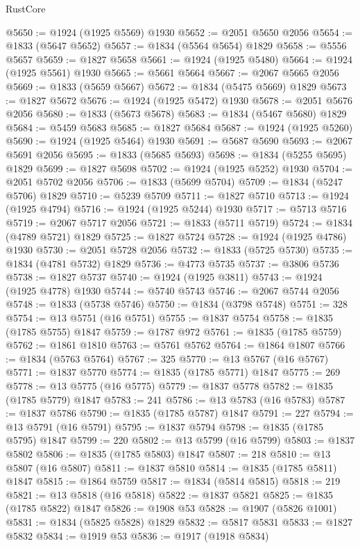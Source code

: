 \begin{lexlean}{RustCore}
\begin{coremodule}
@5650 := @1924 (@1925 @5569) @1930
@5652 := @2051 @5650 @2056
@5654 := @1833 (@5647 @5652)
@5657 := @1834 (@5564 @5654) @1829
@5658 := @5556 @5657
@5659 := @1827 @5658
@5661 := @1924 (@1925 @5480)
@5664 := @1924 (@1925 @5561) @1930
@5665 := @5661 @5664
@5667 := @2067 @5665 @2056
@5669 := @1833 (@5659 @5667)
@5672 := @1834 (@5475 @5669) @1829
@5673 := @1827 @5672
@5676 := @1924 (@1925 @5472) @1930
@5678 := @2051 @5676 @2056
@5680 := @1833 (@5673 @5678)
@5683 := @1834 (@5467 @5680) @1829
@5684 := @5459 @5683
@5685 := @1827 @5684
@5687 := @1924 (@1925 @5260)
@5690 := @1924 (@1925 @5464) @1930
@5691 := @5687 @5690
@5693 := @2067 @5691 @2056
@5695 := @1833 (@5685 @5693)
@5698 := @1834 (@5255 @5695) @1829
@5699 := @1827 @5698
@5702 := @1924 (@1925 @5252) @1930
@5704 := @2051 @5702 @2056
@5706 := @1833 (@5699 @5704)
@5709 := @1834 (@5247 @5706) @1829
@5710 := @5239 @5709
@5711 := @1827 @5710
@5713 := @1924 (@1925 @4794)
@5716 := @1924 (@1925 @5244) @1930
@5717 := @5713 @5716
@5719 := @2067 @5717 @2056
@5721 := @1833 (@5711 @5719)
@5724 := @1834 (@4789 @5721) @1829
@5725 := @1827 @5724
@5728 := @1924 (@1925 @4786) @1930
@5730 := @2051 @5728 @2056
@5732 := @1833 (@5725 @5730)
@5735 := @1834 (@4781 @5732) @1829
@5736 := @4773 @5735
@5737 := @3806 @5736
@5738 := @1827 @5737
@5740 := @1924 (@1925 @3811)
@5743 := @1924 (@1925 @4778) @1930
@5744 := @5740 @5743
@5746 := @2067 @5744 @2056
@5748 := @1833 (@5738 @5746)
@5750 := @1834 (@3798 @5748)
@5751 := 328
@5754 := @13 @5751 (@16 @5751)
@5755 := @1837 @5754
@5758 := @1835 (@1785 @5755) @1847
@5759 := @1787 @972
@5761 := @1835 (@1785 @5759)
@5762 := @1861 @1810
@5763 := @5761 @5762
@5764 := @1864 @1807
@5766 := @1834 (@5763 @5764)
@5767 := 325
@5770 := @13 @5767 (@16 @5767)
@5771 := @1837 @5770
@5774 := @1835 (@1785 @5771) @1847
@5775 := 269
@5778 := @13 @5775 (@16 @5775)
@5779 := @1837 @5778
@5782 := @1835 (@1785 @5779) @1847
@5783 := 241
@5786 := @13 @5783 (@16 @5783)
@5787 := @1837 @5786
@5790 := @1835 (@1785 @5787) @1847
@5791 := 227
@5794 := @13 @5791 (@16 @5791)
@5795 := @1837 @5794
@5798 := @1835 (@1785 @5795) @1847
@5799 := 220
@5802 := @13 @5799 (@16 @5799)
@5803 := @1837 @5802
@5806 := @1835 (@1785 @5803) @1847
@5807 := 218
@5810 := @13 @5807 (@16 @5807)
@5811 := @1837 @5810
@5814 := @1835 (@1785 @5811) @1847
@5815 := @1864 @5759
@5817 := @1834 (@5814 @5815)
@5818 := 219
@5821 := @13 @5818 (@16 @5818)
@5822 := @1837 @5821
@5825 := @1835 (@1785 @5822) @1847
@5826 := @1908 @53
@5828 := @1907 (@5826 @1001)
@5831 := @1834 (@5825 @5828) @1829
@5832 := @5817 @5831
@5833 := @1827 @5832
@5834 := @1919 @53
@5836 := @1917 (@1918 @5834)

\end{coremodule}
\end{lexlean}
